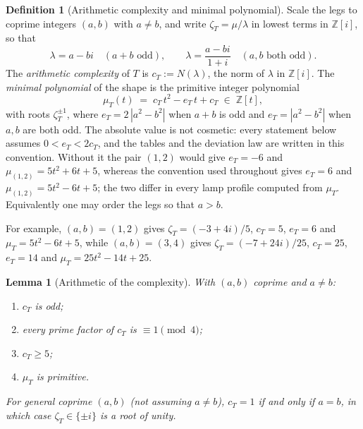 \documentclass[11pt]{article}
\theoremstyle{plain}
\newtheorem{lemma}[theorem]{Lemma}
\theoremstyle{definition}
\newtheorem{definition}[theorem]{Definition}
\theoremstyle{remark}
\begin{document}
\begin{definition}[Arithmetic complexity and minimal polynomial]
\label{def:complexity}
Scale the legs to coprime integers $(a,b)$ with $a \ne b$, and write
$\zeta_T = \mu/\lambda$ in lowest terms in $\mathbb{Z}[i]$, so that
\[
\lambda = a - bi \quad (a+b \text{ odd}), \qquad
\lambda = \frac{a-bi}{1+i} \quad (a, b \text{ both odd}).
\]
The \emph{arithmetic complexity} of $T$ is $c_T := N(\lambda)$, the norm
of $\lambda$ in $\mathbb{Z}[i]$. The \emph{minimal polynomial} of the
shape is the primitive integer polynomial
\[
\mu_T(t) \;=\; c_T\, t^2 - e_T\, t + c_T \;\in\; \mathbb{Z}[t],
\]
with roots $\zeta_T^{\pm 1}$, where $e_T = 2\,|a^2-b^2|$ when $a+b$ is odd
and $e_T = |a^2 - b^2|$ when $a, b$ are both odd. The absolute value is not
cosmetic: every statement below assumes $0 < e_T < 2c_T$, and the tables and
the deviation law are written in this convention. Without it the pair $(1,2)$
would give $e_T = -6$ and $\mu_{(1,2)} = 5t^2+6t+5$, whereas the convention
used throughout gives $e_T = 6$ and $\mu_{(1,2)} = 5t^2-6t+5$; the two differ
in every lamp profile computed from $\mu_T$. Equivalently one may order the
legs so that $a > b$.
\end{definition}

For example, $(a,b) = (1,2)$ gives $\zeta_T = (-3+4i)/5$, $c_T = 5$,
$e_T = 6$ and $\mu_T = 5t^2 - 6t + 5$, while $(a,b) = (3,4)$ gives
$\zeta_T = (-7+24i)/25$, $c_T = 25$, $e_T = 14$ and
$\mu_T = 25t^2 - 14t + 25$.

\begin{lemma}[Arithmetic of the complexity]
\label{lem:complexity-arith}
With $(a,b)$ coprime and $a \ne b$:
\begin{enumerate}[label=\textup{(\roman*)},itemsep=0.1em]
\item $c_T$ is odd;
\item every prime factor of $c_T$ is $\equiv 1 \pmod 4$;
\item $c_T \ge 5$;
\item $\mu_T$ is primitive.
\end{enumerate}
For general coprime $(a,b)$ (not assuming $a \ne b$), $c_T = 1$ if and
only if $a = b$, in which case $\zeta_T \in \{\pm i\}$ is a root of
unity.
\end{lemma}
\end{document}
